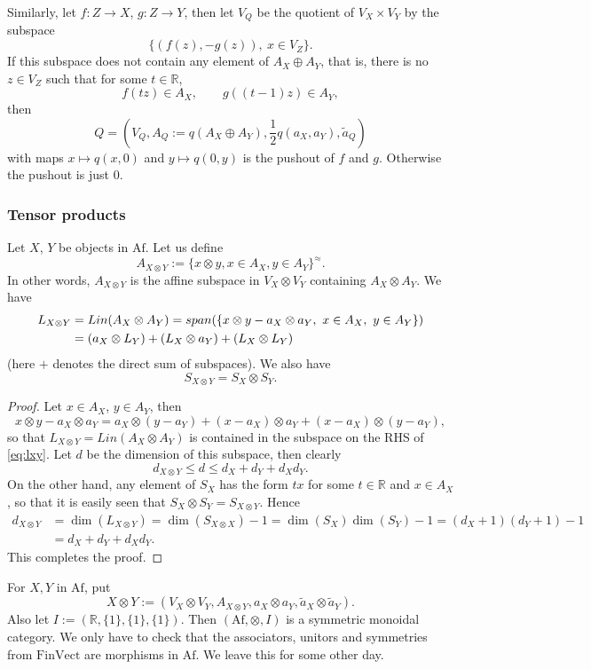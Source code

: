 \documentclass[12pt]{article}
\theoremstyle{definition}
\theoremstyle{remark}
\def \Af{\mathrm{Af}}
\def \FV{\mathrm{FinVect}}
\def\bX{ X}
\def\bY{ Y}
\def\bZ{Z}
\begin{document}
Similarly, let $f:\bZ\to \bX$, $g:\bZ\to \bY$, then let $V_Q$ be the quotient of
$V_\bX\times V_\bY$ by the subspace
\[
\{(f(z),-g(z)),\ x\in V_\bZ\}.
\]
If this subspace does not contain any element of $A_\bX\oplus A_\bY$, that is, there is no
$z\in V_\bZ$ such that for some $t\in \mathbb R$,
\[
f(tz)\in A_\bX,\qquad g((t-1)z)\in A_\bY,
\]
then 
\[
Q=(V_Q, A_Q:=q(A_\bX\oplus A_\bY), \frac12 q(a_X,a_Y), \tilde a_Q)
\]
with maps $x\mapsto q(x,0)$ and $y\mapsto q(0,y)$ is the
pushout of $f$ and $g$. Otherwise the pushout is just $0$.

\subsubsection{Tensor products}

Let $X$, $Y$ be objects in $\Af$. Let us define
\[
A_{X\otimes Y}:=\{x\otimes y, x\in A_X, y\in A_Y\}^{\approx}.
\]
In other words, $A_{X\otimes Y}$ is the affine subspace in $V_X\otimes V_Y$ containing
$A_X\otimes A_Y$. We have
\begin{align}
L_{X\otimes Y}&=Lin(A_X\otimes A_Y)=span(\{x\otimes y-a_X\otimes a_Y,\ x\in A_X,\ y\in
A_Y\})\notag\\
&= (a_X\otimes L_Y)+ (L_X\otimes a_Y)+ (L_X\otimes L_Y)\label{eq:lxy}
\end{align}
(here $+$ denotes the direct sum of subspaces). We also have
\[
S_{X\otimes Y}=S_X\otimes S_Y.
\]

\begin{proof} Let $x\in A_X$, $y\in A_Y$, then
\[
x\otimes y-a_X\otimes a_Y=a_X\otimes (y-a_Y)+(x-a_X)\otimes a_Y+(x-a_X)\otimes (y-a_Y),
\]
so that $L_{X\otimes Y}=Lin(A_X\otimes A_Y)$ is contained in the subspace on the RHS of \eqref{eq:lxy}.
Let $d$ be the dimension of this subspace, then clearly
\[
d_{X\otimes Y}\le d\le d_X+d_Y+d_Xd_Y.
\]
On the other hand, any element of $S_X$ has the form $tx$ for some $t\in \mathbb R$ and
$x\in A_X$, so that it is easily seen that $S_X\otimes S_Y=S_{X\otimes Y}$. 
Hence 
\begin{align*}
d_{X\otimes Y}&=\dim(L_{X\otimes Y})=\dim(S_{X\otimes
X})-1=\dim(S_X)\dim(S_Y)-1=(d_X+1)(d_Y+1)-1\\
&=d_X+d_Y+d_Xd_Y.
\end{align*}
This completes the proof.

\end{proof}

For $X,Y$ in $\Af$, put 
\[
X\otimes Y:=(V_X\otimes V_Y,A_{X\otimes Y},a_X\otimes a_Y, \tilde
a_X\otimes \tilde a_Y).
\]
Also let $I:=(\mathbb R, \{1\},\{1\},\{1\})$. Then $(\Af,\otimes, I)$ is a symmetric
monoidal category. We only have to check that the associators, unitors and symmetries from
$\FV$ are morphisms in $\Af$. We leave this for some other day.
\end{document}
